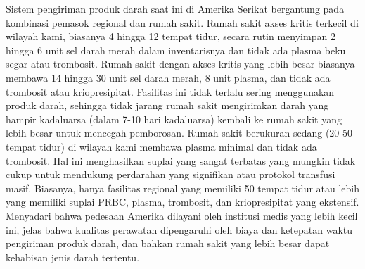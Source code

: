 Sistem pengiriman produk darah saat ini di Amerika Serikat bergantung pada kombinasi pemasok regional dan rumah sakit. Rumah sakit akses kritis terkecil di wilayah kami, biasanya 4 hingga 12 tempat tidur, secara rutin menyimpan 2 hingga 6 unit sel darah merah dalam inventarisnya dan tidak ada plasma beku segar atau trombosit. Rumah sakit dengan akses kritis yang lebih besar biasanya membawa 14 hingga 30 unit sel darah merah, 8 unit plasma, dan tidak ada trombosit atau kriopresipitat. Fasilitas ini tidak terlalu sering menggunakan produk darah, sehingga tidak jarang rumah sakit mengirimkan darah yang hampir kadaluarsa (dalam 7-10 hari kadaluarsa) kembali ke rumah sakit yang lebih besar untuk mencegah pemborosan. Rumah sakit berukuran sedang (20-50 tempat tidur) di wilayah kami membawa plasma minimal dan tidak ada trombosit. Hal ini menghasilkan suplai yang sangat terbatas yang mungkin tidak cukup untuk mendukung perdarahan yang signifikan atau protokol transfusi masif. Biasanya, hanya fasilitas regional yang memiliki 50 tempat tidur atau lebih yang memiliki suplai PRBC, plasma, trombosit, dan kriopresipitat yang ekstensif. Menyadari bahwa pedesaan Amerika dilayani oleh institusi medis yang lebih kecil ini, jelas bahwa kualitas perawatan dipengaruhi oleh biaya dan ketepatan waktu pengiriman produk darah, dan bahkan rumah sakit yang lebih besar dapat kehabisan jenis darah tertentu.